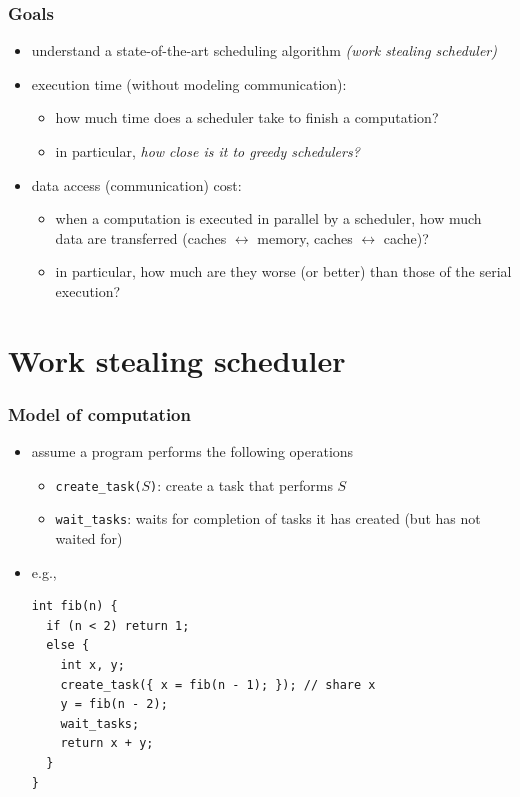 \documentclass[12pt,dvipdfmx]{beamer}
\newcommand{\ao}[1]{{\color{blue}#1}}
\begin{document}
\begin{frame}
\frametitle{Goals}
\begin{itemize}
\item<1-> understand a state-of-the-art scheduling algorithm 
  \ao{\em (work stealing scheduler)}

\item<2-> \ao{execution time (without modeling communication):} 
  \begin{itemize}
  \item how much time does a scheduler take to finish a computation?
  \item in particular, \ao{\em how close is it to greedy schedulers?}
  \end{itemize}

\item<3-> \ao{data access (communication) cost:}
  \begin{itemize}
  \item when a computation is
    executed in parallel by a scheduler, 
    how much data are transferred (caches $\leftrightarrow$ memory,
    caches $\leftrightarrow$ cache)?
  \item in particular, how much are they 
    worse (or better) than those of the serial execution?
  \end{itemize}
\end{itemize}
\end{frame}

\section{Work stealing scheduler}

\begin{frame}[fragile]
\frametitle{Model of computation}

\begin{itemize}
\item assume a program performs the following operations
  \begin{itemize}
  \item \ao{\tt create\_task($S$)}: create a task that performs $S$
  \item \ao{\tt wait\_tasks}: waits for completion of tasks 
    it has created (but has not waited for)
  \end{itemize}
\item e.g.,
\begin{lstlisting}
int fib(n) {
  if (n < 2) return 1;
  else {
    int x, y;
    create_task({ x = fib(n - 1); }); // share x
    y = fib(n - 2);
    wait_tasks;
    return x + y;
  }
}    
\end{lstlisting}
\end{itemize}
\end{frame}
\end{document}
